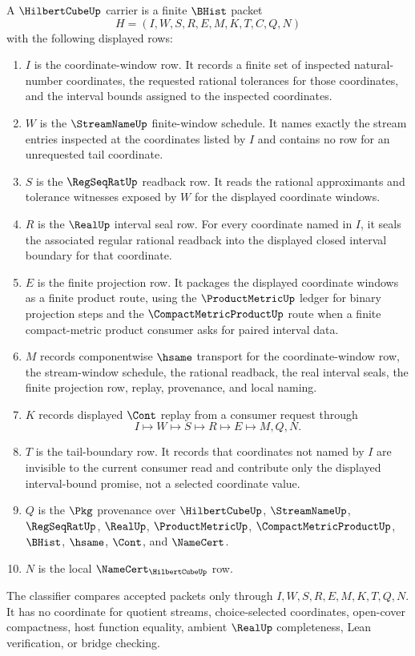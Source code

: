 \begin{definition}
\label{def:hilbert-cube-carrier}
A $\HilbertCubeUp$ carrier is a finite $\BHist$ packet
$$
H=(I,W,S,R,E,M,K,T,C,Q,N)
$$
with the following displayed rows:
\begin{enumerate}
\item $I$ is the coordinate-window row. It records a finite set of inspected natural-number coordinates, the requested rational tolerances for those coordinates, and the interval bounds assigned to the inspected coordinates.
\item $W$ is the $\StreamNameUp$ finite-window schedule. It names exactly the stream entries inspected at the coordinates listed by $I$ and contains no row for an unrequested tail coordinate.
\item $S$ is the $\RegSeqRatUp$ readback row. It reads the rational approximants and tolerance witnesses exposed by $W$ for the displayed coordinate windows.
\item $R$ is the $\RealUp$ interval seal row. For every coordinate named in $I$, it seals the associated regular rational readback into the displayed closed interval boundary for that coordinate.
\item $E$ is the finite projection row. It packages the displayed coordinate windows as a finite product route, using the $\ProductMetricUp$ ledger for binary projection steps and the $\CompactMetricProductUp$ route when a finite compact-metric product consumer asks for paired interval data.
\item $M$ records componentwise $\hsame$ transport for the coordinate-window row, the stream-window schedule, the rational readback, the real interval seals, the finite projection row, replay, provenance, and local naming.
\item $K$ records displayed $\Cont$ replay from a consumer request through
$$
I \longmapsto W \longmapsto S \longmapsto R \longmapsto E \longmapsto M,Q,N .
$$
\item $T$ is the tail-boundary row. It records that coordinates not named by $I$ are invisible to the current consumer read and contribute only the displayed interval-bound promise, not a selected coordinate value.
\item $Q$ is the $\Pkg$ provenance over $\HilbertCubeUp$, $\StreamNameUp$, $\RegSeqRatUp$, $\RealUp$, $\ProductMetricUp$, $\CompactMetricProductUp$, $\BHist$, $\hsame$, $\Cont$, and $\NameCert$.
\item $N$ is the local $\NameCert_{\HilbertCubeUp}$ row.
\end{enumerate}
The classifier compares accepted packets only through $I,W,S,R,E,M,K,T,Q,N$. It has no coordinate for quotient streams, choice-selected coordinates, open-cover compactness, host function equality, ambient $\RealUp$ completeness, Lean verification, or bridge checking.
\end{definition}

